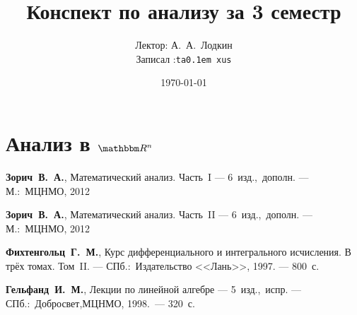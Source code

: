 \documentclass[12pt,ebook]{../notes}
\title{Конспект по анализу за 3 семестр}
\date{\today}
\author{Лектор: А.~А.~Лодкин \\
Записал :\texttt{ta\lower 0.1em \hbox{x}us}}
\begin{document}
 
\maketitle
\tableofcontents
\clearpage

\chapter{Анализ в \texorpdfstring{$\R^n$}{}}



\begin{thebibliography}{9}
  \textbf{Зорич~В.~А.}, 
  Математический анализ. Часть~I ---
  6~изд.,~дополн. ---
  М.:~МЦНМО, 2012
  
  \textbf{Зорич~В.~А.}, 
  Математический анализ. Часть~II ---
  6~изд.,~дополн. ---
  М.:~МЦНМО, 2012
  
  \textbf{Фихтенгольц~Г.~М.}, 
  Курс дифференциального и интегрального исчисления. В трёх томах. Том~II. ---
  СПб.:~Издательство <<Лань>>, 1997. ---
  800~с.
  
  \textbf{Гельфанд~И.~М.}, 
  Лекции по линейной алгебре --- 5~изд.,~испр. ---
  СПб.:~Добросвет,МЦНМО, 1998.~---
  320~с.
\end{thebibliography}
\end{document}
